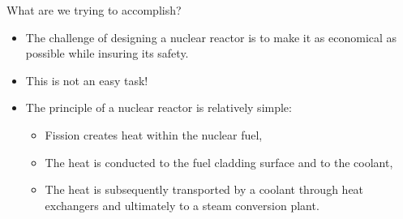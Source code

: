 \documentclass[xcolor=x11names,compress]{beamer}
\renewcommand{\(}{\begin{columns}}
\renewcommand{\)}{\end{columns}}
\newcommand{\<}[1]{\begin{column}{#1}}
\renewcommand{\>}{\end{column}}
\begin{document}

\begin{frame}{What are we trying to accomplish?}
\begin{itemize}
\item The challenge of designing a nuclear reactor is to make it as economical as possible while insuring its safety.
\item This is not an easy task!
\item The principle of a nuclear reactor is relatively simple:
\begin{itemize}
\item Fission creates heat within the nuclear fuel,
\item The heat is conducted to the fuel cladding surface and to the coolant,
\item The heat is subsequently transported by a coolant through heat exchangers and ultimately to a steam conversion plant.
\end{itemize}
\end{itemize}
\end{frame}
\end{document}
